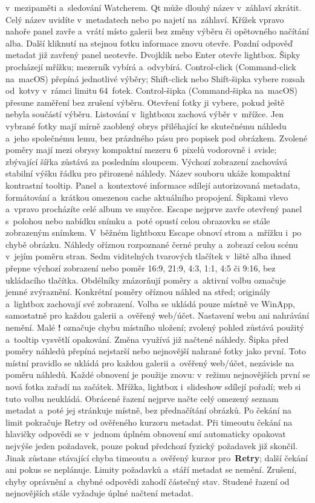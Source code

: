 \documentclass[11pt,a4paper]{article}
\newcommand{\ui}[1]{\textbf{#1}}
\begin{document}
v~mezipaměti a~sledování Watcherem.
Qt může dlouhý název v~záhlaví zkrátit. Celý název uvidíte v~metadatech
nebo po najetí na~záhlaví.
Křížek vpravo nahoře panel zavře a~vrátí místo galerii bez změny výběru
či opětovného načítání alba. Další kliknutí na stejnou fotku informace znovu
otevře. Pozdní odpověď metadat již zavřený panel neotevře.
Dvojklik nebo Enter otevře lightbox. Šipky procházejí mřížku; mezerník vybírá
a~odvybírá. Control-click (Command-click na~macOS) přepíná jednotlivé výběry;
Shift-click nebo Shift-šipka vybere rozsah od~kotvy v~rámci limitu 64~fotek.
Control-šipka (Command-šipka na~macOS) přesune zaměření bez zrušení výběru.
Otevření fotky ji vybere, pokud ještě nebyla součástí výběru. Listování
v~lightboxu zachová výběr v~mřížce.
Jen vybrané fotky mají mírně zaoblený obrys přiléhající ke skutečnému náhledu
a~jeho společnému lemu, bez prázdného pásu pro popisek pod obrázkem. Zvolené
poměry mají mezi obrysy kompaktní mezeru 6~pixelů vodorovně i~svisle;
zbývající šířka zůstává za posledním sloupcem. Výchozí zobrazení zachovává
stabilní výšku řádku pro přirozené náhledy. Název souboru ukáže kompaktní
kontrastní tooltip. Panel a~kontextové informace sdílejí autorizovaná metadata,
formátování a~krátkou omezenou cache aktuálního propojení.
Šipkami vlevo a~vpravo procházíte celé album ve smyčce.
Escape nejprve zavře otevřený panel s~polohou nebo nabídku snímku a~poté
opustí celou obrazovku se stále zobrazeným snímkem. V~běžném lightboxu
Escape obnoví strom a~mřížku i~po chybě obrázku. Náhledy oříznou rozpoznané
černé pruhy a~zobrazí celou scénu
v~jejím poměru stran. Sedm viditelných tvarových tlačítek v~liště alba ihned
přepne výchozí zobrazení nebo poměr 16:9, 21:9, 4:3, 1:1, 4:5 či 9:16, bez
ukládacího tlačítka. Obdélníky znázorňují poměry a~aktivní volbu označuje
jemné zvýraznění. Konkrétní poměry oříznou náhled na střed; originály a~lightbox
zachovají své zobrazení. Volba se ukládá pouze místně ve WinApp, samostatně
pro každou galerii a~ověřený web/účet. Nastavení webu ani nahrávání nemění.
Malé \textbf{!} označuje chybu místního uložení; zvolený pohled zůstává použitý
a~tooltip vysvětlí opakování. Změna využívá již načtené náhledy.
Šipka před poměry náhledů přepíná nejstarší nebo nejnovější nahrané fotky
jako první. Toto místní pravidlo se ukládá pro každou galerii a~ověřený web/účet,
nezávisle na poměru náhledů. Každé obnovení je použije znovu: v~režimu nejnovějších
první se nová fotka zařadí na začátek. Mřížka, lightbox i~slideshow sdílejí pořadí;
web si tuto volbu neukládá. Obrácené řazení nejprve načte celý omezený seznam
metadat a~poté jej stránkuje místně, bez přednačítání obrázků. Po čekání
na limit pokračuje Retry od ověřeného kurzoru metadat. Při timeoutu čekání na hlavičky odpovědi se v~jednom úplném obnovení smí
automaticky opakovat nejvýše jeden požadavek, pouze pokud předchozí fyzický
požadavek již skončil. Jinak zůstane stávající chyba timeoutu a~ověřený kurzor
pro~\ui{Retry}; další čekání ani pokus se neplánuje. Limity požadavků a~stáří
metadat se nemění. Zrušení, chyby oprávnění a~chybné odpovědi zahodí částečný
stav. Studené řazení od nejnovějších stále vyžaduje úplné načtení metadat.
\end{document}
